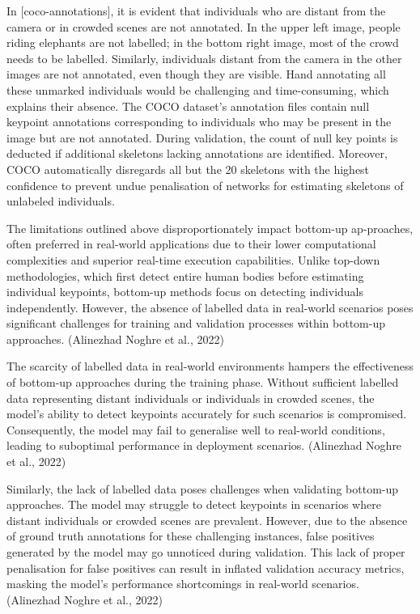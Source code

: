 
In [coco-annotations], it is evident that individuals who are distant from the camera or in crowded scenes are not annotated. In the upper left image, people riding elephants are not labelled; in the bottom right image, most of the crowd needs to be labelled. Similarly, individuals distant from the camera in the other images are not annotated, even though they are visible. Hand annotating all these unmarked individuals would be challenging and time-consuming, which explains their absence. The COCO dataset's annotation files contain null keypoint annotations corresponding to individuals who may be present in the image but are not annotated. During validation, the count of null key points is deducted if additional skeletons lacking annotations are identified. Moreover, COCO automatically disregards all but the 20 skeletons with the highest confidence to prevent undue penalisation of networks for estimating skeletons of unlabeled individuals.

The limitations outlined above disproportionately impact bottom-up ap-\break proaches, often preferred in real-world applications due to their lower computational complexities and superior real-time execution capabilities. Unlike top-down methodologies, which first detect entire human bodies before estimating individual keypoints, bottom-up methods focus on detecting individuals independently. However, the absence of labelled data in real-world scenarios poses significant challenges for training and validation processes within bottom-up approaches. (\scc Alinezhad Noghre et al., 2022)

The scarcity of labelled data in real-world environments hampers the effectiveness of bottom-up approaches during the training phase. Without sufficient labelled data representing distant individuals or individuals in crowded scenes, the model's ability to detect keypoints accurately for such scenarios is compromised. Consequently, the model may fail to generalise well to real-world conditions, leading to suboptimal performance in deployment scenarios. (\scc Alinezhad Noghre et al., 2022)

Similarly, the lack of labelled data poses challenges when validating bottom-up approaches. The model may struggle to detect keypoints in scenarios where distant individuals or crowded scenes are prevalent. However, due to the absence of ground truth annotations for these challenging instances, false positives generated by the model may go unnoticed during validation. This lack of proper penalisation for false positives can result in inflated validation accuracy metrics, masking the model's performance shortcomings in real-world scenarios. (\scc Alinezhad Noghre et al., 2022)

